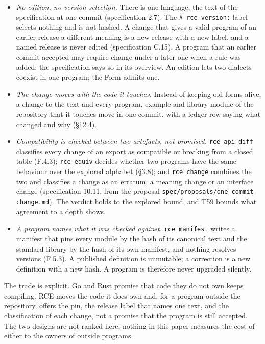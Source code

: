\documentclass[10pt,letterpaper]{article}
\providecommand{\tightlist}{\setlength{\itemsep}{1pt}\setlength{\parskip}{0pt}}
\begin{document}
\begin{itemize}
\tightlist
\item
  \emph{No edition, no version selection.} There is one language, the
  text of the specification at one commit (specification 2.7). The
  \texttt{\#\ rce-\allowbreak{}version:} label selects nothing and is not hashed. A
  change that gives a valid program of an earlier release a different
  meaning is a new release with a new label, and a named release is
  never edited (specification C.15). A program that an earlier commit
  accepted may require change under a later one when a rule was added;
  the specification says so in its overview. An edition lets two
  dialects coexist in one program; the Form admits one.
\item
  \emph{The change moves with the code it touches.} Instead of keeping
  old forms alive, a change to the text and every program, example and
  library module of the repository that it touches move in one commit,
  with a ledger row saying what changed and why
  (\href{https://research.openie.dev/papers/rce/\#124-how-the-language-grows-and-shrinks}{§12.4}).
\item
  \emph{Compatibility is checked between two artefacts, not promised.}
  \texttt{rce\ api-diff} classifies every change of an export as
  compatible or breaking from a closed table (F.4.3);
  \texttt{rce\ equiv} decides whether two programs have the same
  behaviour over the explored alphabet
  (\href{https://research.openie.dev/papers/rce/\#38-behaviour-equivalence-and-dimension}{§3.8});
  and \texttt{rce\ change} combines the two and classifies a change as
  an erratum, a meaning change or an interface change (specification
  10.11, from the proposal
  \texttt{spec/\allowbreak{}proposals/\allowbreak{}one-\allowbreak{}commit-\allowbreak{}change.\allowbreak{}md}). The verdict holds to
  the explored bound, and T59 bounds what agreement to a depth shows.
\item
  \emph{A program names what it was checked against.}
  \texttt{rce\ manifest} writes a manifest that pins every module by the
  hash of its canonical text and the standard library by the hash of its
  own manifest, and nothing resolves versions (F.5.3). A published
  definition is immutable; a correction is a new definition with a new
  hash. A program is therefore never upgraded silently.
\end{itemize}

The trade is explicit. Go and Rust promise that code they do not own
keeps compiling. RCE moves the code it does own and, for a program
outside the repository, offers the pin, the release label that names one
text, and the classification of each change, not a promise that the
program is still accepted. The two designs are not ranked here; nothing
in this paper measures the cost of either to the owners of outside
programs.
\end{document}
